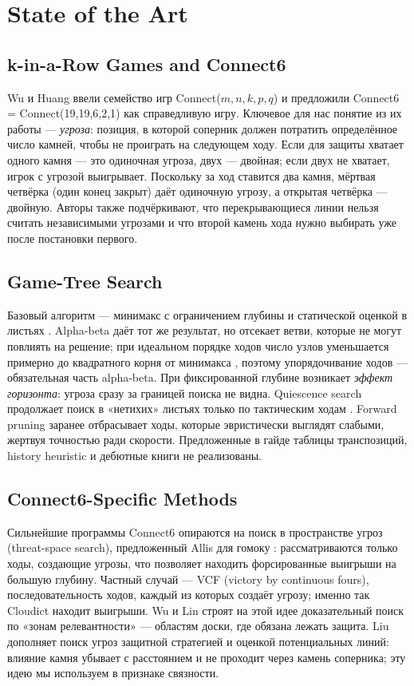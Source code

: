 \documentclass[a4paper,10pt,twocolumn]{article}
\begin{document}
\section{State of the Art}\label{sec:sota}

\subsection{k-in-a-Row Games and Connect6}
Wu и Huang \citeyearpar{wu2005family} ввели семейство игр Connect($m,n,k,p,q$) и предложили Connect6 = Connect(19,19,6,2,1) как справедливую игру. Ключевое для нас понятие из их работы --- \emph{угроза}: позиция, в которой соперник должен потратить определённое число камней, чтобы не проиграть на следующем ходу. Если для защиты хватает одного камня --- это одиночная угроза, двух --- двойная; если двух не хватает, игрок с угрозой выигрывает. Поскольку за ход ставится два камня, мёртвая четвёрка (один конец закрыт) даёт одиночную угрозу, а открытая четвёрка --- двойную. Авторы также подчёркивают, что перекрывающиеся линии нельзя считать независимыми угрозами и что второй камень хода нужно выбирать уже после постановки первого.

\subsection{Game-Tree Search}
Базовый алгоритм --- минимакс с ограничением глубины и статической оценкой в листьях \citep{russell2020aima}. Alpha-beta даёт тот же результат, но отсекает ветви, которые не могут повлиять на решение; при идеальном порядке ходов число узлов уменьшается примерно до квадратного корня от минимакса \citep{knuth1975alphabeta}, поэтому упорядочивание ходов --- обязательная часть alpha-beta. При фиксированной глубине возникает \emph{эффект горизонта}: угроза сразу за границей поиска не видна. Quiescence search продолжает поиск в «нетихих» листьях только по тактическим ходам \citep{russell2020aima}. Forward pruning заранее отбрасывает ходы, которые эвристически выглядят слабыми, жертвуя точностью ради скорости. Предложенные в гайде таблицы транспозиций, history heuristic и дебютные книги \citep{statement} не реализованы.

\subsection{Connect6-Specific Methods}
Сильнейшие программы Connect6 опираются на поиск в пространстве угроз (threat-space search), предложенный Allis для гомоку \citep{allis1994}: рассматриваются только ходы, создающие угрозы, что позволяет находить форсированные выигрыши на большую глубину. Частный случай --- VCF (victory by continuous fours), последовательность ходов, каждый из которых создаёт угрозу; именно так Cloudict находит выигрыши. Wu и Lin \citeyearpar{wu2010rzop} строят на этой идее доказательный поиск по «зонам релевантности» --- областям доски, где обязана лежать защита. Liu \citeyearpar{liu_defensive} дополняет поиск угроз защитной стратегией и оценкой потенциальных линий: влияние камня убывает с расстоянием и не проходит через камень соперника; эту идею мы используем в признаке связности.
\end{document}
